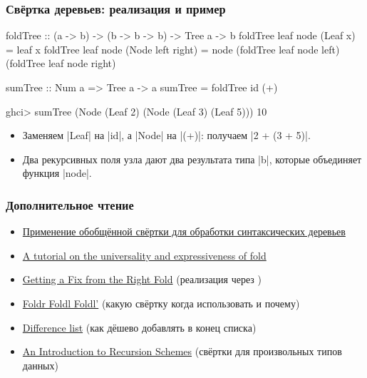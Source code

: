 \documentclass[11pt]{beamer}
\begin{document}
\begin{frame}[fragile]
  \frametitle{Свёртка деревьев: реализация и пример}
  \begin{haskellsmall}
    foldTree :: (a -> b) -> (b -> b -> b) -> Tree a -> b
    foldTree leaf node (Leaf x) = leaf x
    foldTree leaf node (Node left right) =
        node (foldTree leaf node left)
             (foldTree leaf node right)

    sumTree :: Num a => Tree a -> a
    sumTree = foldTree id (+)

    ghci> sumTree (Node (Leaf 2) (Node (Leaf 3) (Leaf 5)))
    10
  \end{haskellsmall}
  \begin{itemize}
    \item Заменяем \haskinline|Leaf| на \haskinline|id|, а \haskinline|Node| на \haskinline|(+)|: получаем \haskinline|2 + (3 + 5)|.
    \item Два рекурсивных поля узла дают два результата типа \haskinline|b|, которые объединяет функция \haskinline|node|.
  \end{itemize}
\end{frame}
\begin{frame}[fragile]
  \frametitle{Дополнительное чтение}
  \begin{itemize}
    \item \href{https://habr.com/ru/articles/667058/}{Применение обобщённой свёртки для обработки синтаксических деревьев}
    \item \href{https://people.cs.nott.ac.uk/pszgmh/fold.pdf}{A tutorial on the universality and expressiveness of fold}
    \item \href{https://wiki.haskell.org/wikiupload/1/14/TMR-Issue6.pdf}{Getting a Fix from the Right Fold} (реализация  через )
    \item \href{https://wiki.haskell.org/Foldr_Foldl_Foldl%27}{Foldr Foldl Foldl'} (какую свёртку когда использовать и почему)
    \item \href{https://wiki.haskell.org/Difference_list}{Difference list} (как дёшево добавлять в конец списка)
    \item \href{https://blog.sumtypeofway.com/posts/introduction-to-recursion-schemes.html}{An Introduction to Recursion Schemes} (свёртки для произвольных типов данных)
  \end{itemize} 
\end{frame}
\end{document}
